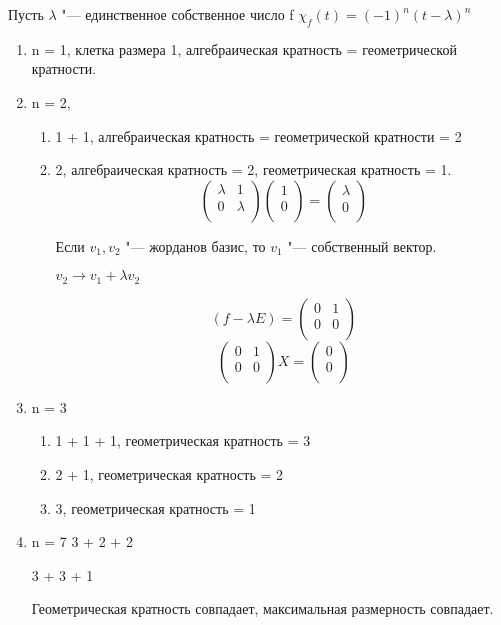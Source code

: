 \begin{exmp}
Пусть $\lambda$ "--- единственное собственное число f $\chi_f(t) = (-1)^{n}(t - \lambda)^n$
\begin{enumerate}
\item n = 1, клетка размера 1, алгебраическая кратность  = геометрической кратности.
\item n = 2, 
\begin{enumerate}
\item 1 + 1, алгебраическая кратность  = геометрической кратности = 2
\item 2, алгебраическая кратность = 2, геометрическая кратность = 1.
$$
\begin{pmatrix}
\lambda & 1\\
0&\lambda\\
\end{pmatrix} \begin{pmatrix}
1\\
0\\
\end{pmatrix}
= \begin{pmatrix}
\lambda\\
0\\
\end{pmatrix}
$$

Если $v_1, v_2$ "--- жорданов базис, то $v_1$ "--- собственный вектор.

$v_2 \to v_1 + \lambda v_2$

$$(f - \lambda E) = \begin{pmatrix}
0&1\\
0&0\\
\end{pmatrix}$$
$$
\begin{pmatrix}
0&1\\
0&0\\
\end{pmatrix} X = \begin{pmatrix}
0\\
0\\
\end{pmatrix}
$$
\end{enumerate}

\item n = 3
\begin{enumerate}
\item 1 + 1 + 1, геометрическая кратность = 3
\item 2 + 1, геометрическая кратность = 2
\item 3, геометрическая кратность = 1
\end{enumerate}

\item n = 7
3 + 2 + 2

3 + 3 + 1

Геометрическая кратность совпадает, максимальная размерность совпадает.
\end{enumerate}
\end{exmp}

